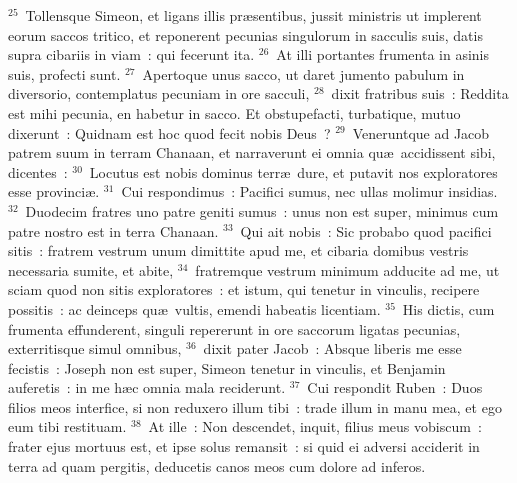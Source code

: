 ${}^{25}$~Tollensque Simeon, et ligans illis pr\ae sentibus, jussit ministris ut implerent eorum saccos tritico, et reponerent pecunias singulorum in sacculis suis, datis supra cibariis in viam~: qui fecerunt ita.
${}^{26}$~At illi portantes frumenta in asinis suis, profecti sunt.
${}^{27}$~Apertoque unus sacco, ut daret jumento pabulum in diversorio, contemplatus pecuniam in ore sacculi,
${}^{28}$~dixit fratribus suis~: Reddita est mihi pecunia, en habetur in sacco. Et obstupefacti, turbatique, mutuo dixerunt~: Quidnam est hoc quod fecit nobis Deus~?
${}^{29}$~Veneruntque ad Jacob patrem suum in terram Chanaan, et narraverunt ei omnia qu\ae\ accidissent sibi, dicentes~:
${}^{30}$~Locutus est nobis dominus terr\ae\ dure, et putavit nos exploratores esse provinci\ae .
${}^{31}$~Cui respondimus~: Pacifici sumus, nec ullas molimur insidias.
${}^{32}$~Duodecim fratres uno patre geniti sumus~: unus non est super, minimus cum patre nostro est in terra Chanaan.
${}^{33}$~Qui ait nobis~: Sic probabo quod pacifici sitis~: fratrem vestrum unum dimittite apud me, et cibaria domibus vestris necessaria sumite, et abite,
${}^{34}$~fratremque vestrum minimum adducite ad me, ut sciam quod non sitis exploratores~: et istum, qui tenetur in vinculis, recipere possitis~: ac deinceps qu\ae\ vultis, emendi habeatis licentiam.
${}^{35}$~His dictis, cum frumenta effunderent, singuli repererunt in ore saccorum ligatas pecunias, exterritisque simul omnibus,
${}^{36}$~dixit pater Jacob~: Absque liberis me esse fecistis~: Joseph non est super, Simeon tenetur in vinculis, et Benjamin auferetis~: in me h\ae c omnia mala reciderunt.
${}^{37}$~Cui respondit Ruben~: Duos filios meos interfice, si non reduxero illum tibi~: trade illum in manu mea, et ego eum tibi restituam.
${}^{38}$~At ille~: Non descendet, inquit, filius meus vobiscum~: frater ejus mortuus est, et ipse solus remansit~: si quid ei adversi acciderit in terra ad quam pergitis, deducetis canos meos cum dolore ad inferos.

